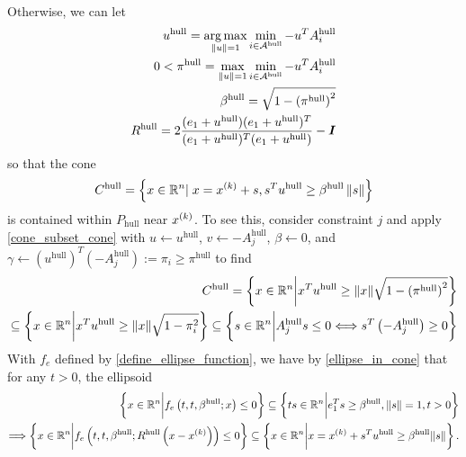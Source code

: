 Otherwise, we can let
\begin{align*}
u^{\textrm{hull}} = \operatorname*{arg\,max}_{\|u\| = 1} \min_{i \in \mathcal A^{\textrm{hull}}} -u^TA_i^{\textrm{hull}} \\
0 < \pi^{\textrm{hull}} = \max_{\|u\| = 1} \min_{i \in \mathcal A^{\textrm{hull}}} -u^TA_i^{\textrm{hull}} \\
\beta^{\textrm{hull}} = \sqrt{1 - \left(\pi^{\textrm{hull}}\right)^2} \\
R^{\textrm{hull}} = 2\frac{(e_1 + u^{\textrm{hull}})(e_1 + u^{\textrm{hull}})^T}{(e_1 + u^{\textrm{hull}})^T(e_1 + u^{\textrm{hull}})} - \boldsymbol I
\end{align*}
so that the cone
\begin{align*}
C^{\textrm{hull}} = \left\{x \in \mathbb R^n | \; x = x^{(k)} + s, s^Tu^{\textrm{hull}} \ge \beta^{\textrm{hull}} \left\|s\right\| \right\}
\end{align*}
is contained within $P_{\textrm{hull}}$ near $x^{(k)}$.
To see this, consider constraint $j$ and apply \cref{cone_subset_cone} with
$u \gets u^{\textrm{hull}}$, 
$v \gets -A_j^{\textrm{hull}}$, 
$\beta \gets 0$, 
and $\gamma \gets \left(u^{\textrm{hull}} \right)^T \left( -A_j^{\textrm{hull}}\right) := \pi_i \ge \pi^{\textrm{hull}}$
to find
\begin{align*}
C^{\textrm{hull}} = \left\{x \in \mathbb R^n \bigg | x^T u^\textrm{hull} \ge \|x\| \sqrt{1 - \left(\pi^{\textrm{hull}}\right)^2} \right\} \\
\subseteq \left\{x \in \mathbb R^n \bigg | x^T u^\textrm{hull} \ge \|x\| \sqrt{1 - \pi_i^2} \right\} 
\subseteq \left\{s \in \mathbb R^n \bigg| A_j^{\textrm{hull}} s \le 0 \Longleftrightarrow s^T\left(-A_j^{\textrm{hull}}\right) \ge 0 \right\}
\end{align*}
With $f_e$ defined by \cref{define_ellipse_function}, we have by \cref{ellipse_in_cone} that
for any $t > 0$, the ellipsoid
\begin{align*}
\left\{x \in \mathbb R^n \bigg | f_e\left(t, t,  \beta^{\textrm{hull}}; x \right) \le 0\right\} \subseteq \left\{ts \in \mathbb R^n \bigg | e_1^T s \ge \beta^{\textrm{hull}}, \|s\| = 1, t > 0\right\} \\
\Longrightarrow \left\{x \in \mathbb R^n \bigg | f_e\left(t, t,  \beta^{\textrm{hull}};  R^{\textrm{hull}}\left(x - x^{(k)}\right) \right) \le 0\right\}
\subseteq \left\{x \in \mathbb R^n \bigg | x = x^{(k)} + s^Tu^{\textrm{hull}} \ge \beta^{\textrm{hull}}\|s\| \right\}.
\end{align*}

